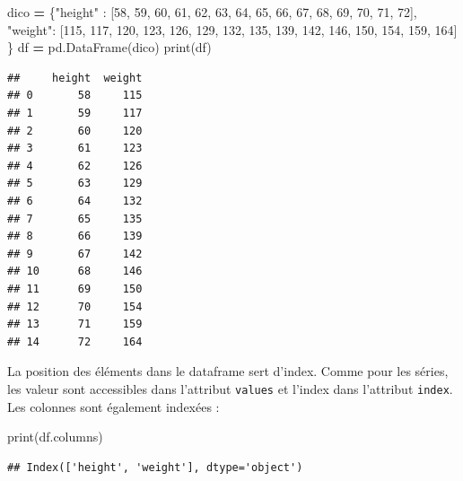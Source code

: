 \documentclass[12pt,]{book}
\newenvironment{Shaded}{\begin{snugshade}}{\end{snugshade}}
\newcommand{\DecValTok}[1]{\textcolor[rgb]{0.00,0.00,0.81}{#1}}
\newcommand{\StringTok}[1]{\textcolor[rgb]{0.31,0.60,0.02}{#1}}
\newcommand{\OperatorTok}[1]{\textcolor[rgb]{0.81,0.36,0.00}{\textbf{#1}}}
\newcommand{\BuiltInTok}[1]{#1}
\newcommand{\NormalTok}[1]{#1}
\numberwithin{equation}{section}
\numberwithin{countremarque}{section}
\begin{document}
\begin{Shaded}
\begin{Highlighting}[]
\NormalTok{dico }\OperatorTok{=}\NormalTok{ \{}\StringTok{"height"}\NormalTok{ : }
\NormalTok{               [}\DecValTok{58}\NormalTok{, }\DecValTok{59}\NormalTok{, }\DecValTok{60}\NormalTok{, }\DecValTok{61}\NormalTok{, }\DecValTok{62}\NormalTok{,}
                \DecValTok{63}\NormalTok{, }\DecValTok{64}\NormalTok{, }\DecValTok{65}\NormalTok{, }\DecValTok{66}\NormalTok{, }\DecValTok{67}\NormalTok{,}
                \DecValTok{68}\NormalTok{, }\DecValTok{69}\NormalTok{, }\DecValTok{70}\NormalTok{, }\DecValTok{71}\NormalTok{, }\DecValTok{72}\NormalTok{],}
        \StringTok{"weight"}\NormalTok{: }
\NormalTok{               [}\DecValTok{115}\NormalTok{, }\DecValTok{117}\NormalTok{, }\DecValTok{120}\NormalTok{, }\DecValTok{123}\NormalTok{, }\DecValTok{126}\NormalTok{,}
                \DecValTok{129}\NormalTok{, }\DecValTok{132}\NormalTok{, }\DecValTok{135}\NormalTok{, }\DecValTok{139}\NormalTok{, }\DecValTok{142}\NormalTok{,}
                \DecValTok{146}\NormalTok{, }\DecValTok{150}\NormalTok{, }\DecValTok{154}\NormalTok{, }\DecValTok{159}\NormalTok{, }\DecValTok{164}\NormalTok{]}
\NormalTok{       \} }
\NormalTok{df }\OperatorTok{=}\NormalTok{ pd.DataFrame(dico)}
\BuiltInTok{print}\NormalTok{(df)}
\end{Highlighting}
\end{Shaded}

\begin{lstlisting}
##     height  weight
## 0       58     115
## 1       59     117
## 2       60     120
## 3       61     123
## 4       62     126
## 5       63     129
## 6       64     132
## 7       65     135
## 8       66     139
## 9       67     142
## 10      68     146
## 11      69     150
## 12      70     154
## 13      71     159
## 14      72     164
\end{lstlisting}

La position des éléments dans le dataframe sert d'index. Comme pour les
séries, les valeur sont accessibles dans l'attribut \texttt{values} et
l'index dans l'attribut \texttt{index}. Les colonnes sont également
indexées :

\begin{Shaded}
\begin{Highlighting}[]
\BuiltInTok{print}\NormalTok{(df.columns)}
\end{Highlighting}
\end{Shaded}

\begin{lstlisting}
## Index(['height', 'weight'], dtype='object')
\end{lstlisting}
\end{document}

